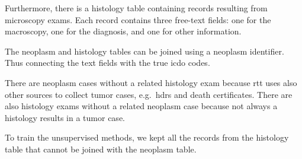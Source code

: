 Furthermore, there is a histology table containing records resulting
from microscopy exams. Each record contains three free-text
fields: one for the macroscopy, one for the diagnosis, and one for
other information.

The neoplasm and histology tables can be joined using a
neoplasm identifier. Thus connecting the text
fields with the true \ac{icdo} codes.


There are neoplasm cases
without a related histology exam because \ac{rtt} uses also other
sources to collect tumor cases, e.g.\ \acp{hdr} and death
certificates. There are also histology exams without a related
neoplasm 
case because not always a histology results in a tumor case.

To train the unsupervised methods, we kept all the records from the
histology table that cannot be joined with 
the neoplasm table.

